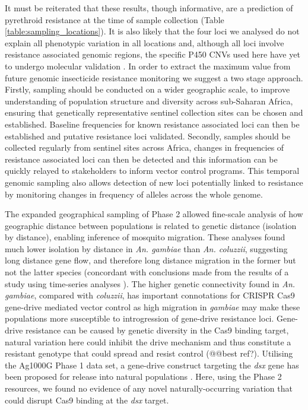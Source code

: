 \documentclass[a4paper,11pt,abstracton,hidelinks]{scrartcl}
\begin{document}
It must be reiterated that these results, though informative, are a prediction of pyrethroid resistance at the time of sample collection (Table \ref{table:sampling_locations}).
%
It is also likely that the four loci we analysed do not explain all phenotypic variation in all locations \cite{donnelly2016, mitchell2014} and, although all loci involve resistance associated genomic regions, the specific P450 CNVs used here have yet to undergo molecular validation \cite{lucas2019}.
%
In order to extract the maximum value from future genomic insecticide resistance monitoring we suggest a two stage approach.
%
Firstly, sampling should be conducted on a wider geographic scale, to improve understanding of population structure and diversity across sub-Saharan Africa, ensuring that genetically representative sentinel collection sites can be chosen and established.
%
Baseline frequencies for known resistance associated loci can then be established and putative resistance loci validated.
%
Secondly, samples should be collected regularly from sentinel sites across Africa, changes in frequencies of resistance associated loci can then be detected and this information can be quickly relayed to stakeholders to inform vector control programs.
%
This temporal genomic sampling also allows detection of new loci potentially linked to resistance by monitoring changes in frequency of alleles across the whole genome.


The expanded geographical sampling of Phase 2 allowed fine-scale analysis of how geographic distance between populations is related to genetic distance (isolation by distance), enabling inference of mosquito migration.
%
These analyses found much lower isolation by distance in \textit{An. gambiae} than \textit{An. coluzzii}, suggesting long distance gene flow, and therefore long distance migration in the former but not the latter species (concordant with conclusions made from the results of a study using time-series analyses \cite{dao2014}).
%
The higher genetic connectivity found in \textit{An. gambiae}, compared with \textit{coluzzii}, has important connotations for CRISPR Cas9 gene-drive mediated vector control as high migration in \textit{gambiae} may make these populations more susceptible to introgression of gene-drive resistance loci.
%
Gene-drive resistance can be caused by genetic diversity in the Cas9 binding target, natural variation here could inhibit the drive mechanism and thus constitute a resistant genotype that could spread and resist control (@@best ref?).
%
Utilising the Ag1000G Phase 1 data set, a gene-drive construct targeting the \textit{dsx} gene has been proposed for release into natural populations \cite{kyrou2018}.
%
Here, using the Phase 2 resources, we found no evidence of any novel naturally-occurring variation that could disrupt Cas9 binding at the \textit{dsx} target.
\end{document}

